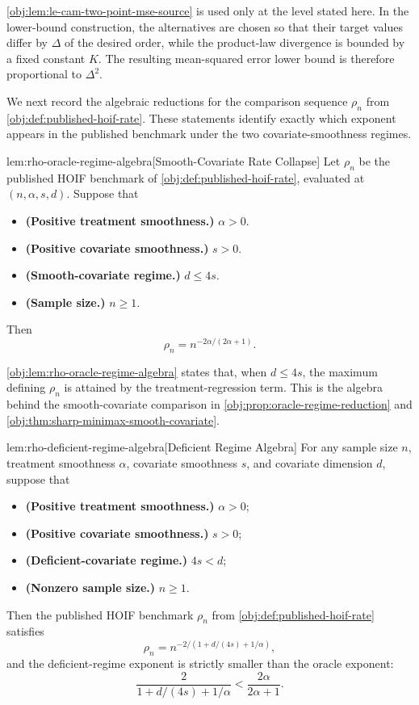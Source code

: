 \cref{obj:lem:le-cam-two-point-mse-source} is used only at the level stated here. In the lower-bound construction, the alternatives are chosen so that their target values differ by \(\Delta\) of the desired order, while the product-law divergence is bounded by a fixed constant \(K\). The resulting mean-squared error lower bound is therefore proportional to \(\Delta^2\).

We next record the algebraic reductions for the comparison sequence \(\rho_n\) from \cref{obj:def:published-hoif-rate}. These statements identify exactly which exponent appears in the published benchmark under the two covariate-smoothness regimes.

\begin{lemmav}{lem:rho-oracle-regime-algebra}[Smooth-Covariate Rate Collapse]
Let $\rho_n$ be the published HOIF benchmark of \cref{obj:def:published-hoif-rate}, evaluated at $(n,\alpha,s,d)$. Suppose that
\begin{itemize}
\item \textbf{(Positive treatment smoothness.)} $\alpha>0$.
\item \textbf{(Positive covariate smoothness.)} $s>0$.
\item \textbf{(Smooth-covariate regime.)} $d\le 4s$.
\item \textbf{(Sample size.)} $n\ge 1$.
\end{itemize}
Then
\[
\rho_n
=
n^{-2\alpha/(2\alpha+1)} .
\]
\end{lemmav}

\cref{obj:lem:rho-oracle-regime-algebra} states that, when \(d\le 4s\), the maximum defining \(\rho_n\) is attained by the treatment-regression term. This is the algebra behind the smooth-covariate comparison in \cref{obj:prop:oracle-regime-reduction} and \cref{obj:thm:sharp-minimax-smooth-covariate}.

\begin{lemmav}{lem:rho-deficient-regime-algebra}[Deficient Regime Algebra]
For any sample size $n$, treatment smoothness $\alpha$, covariate smoothness $s$, and covariate dimension $d$, suppose that
\begin{itemize}
\item \textbf{(Positive treatment smoothness.)} $\alpha>0$;
\item \textbf{(Positive covariate smoothness.)} $s>0$;
\item \textbf{(Deficient-covariate regime.)} $4s<d$;
\item \textbf{(Nonzero sample size.)} $n\ge 1$.
\end{itemize}
Then the published HOIF benchmark $\rho_n$ from \cref{obj:def:published-hoif-rate} satisfies
\[
\rho_n
=
n^{-2/(1+d/(4s)+1/\alpha)},
\]
and the deficient-regime exponent is strictly smaller than the oracle exponent:
\[
\frac{2}{1+d/(4s)+1/\alpha}
<
\frac{2\alpha}{2\alpha+1}.
\]
\end{lemmav}

